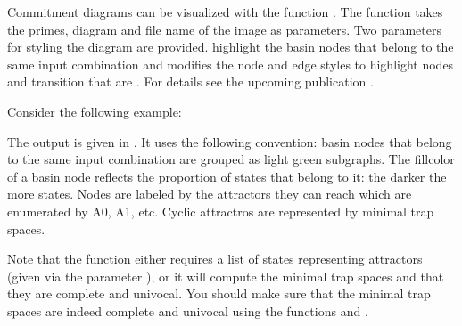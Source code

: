 \documentclass[letterpaper,10pt,english]{sphinxmanual}
\begin{document}
Commitment diagrams can be visualized with the function .
The function takes the primes, diagram and file name of the image as parameters.
Two parameters for styling the diagram are provided.
 highlight the basin nodes that belong to the same input combination and  modifies the node and edge styles to
highlight nodes and transition that are . For details see the upcoming publication {\hyperref[\detokenize{Bibliography:klarner2016basins}]{}}.

Consider the following example:

\begin{sphinxVerbatim}[commandchars=\\\{\}]
  
    
\end{sphinxVerbatim}

The output is given in {\hyperref[\detokenize{Manual:figure26}]{}}.
It uses the following convention: basin nodes that belong to the same input combination are grouped as light green subgraphs.
The fillcolor of a basin node reflects the proportion of states that belong to it: the darker the more states.
Nodes are labeled by the attractors they can reach which are enumerated by A0, A1, etc.
Cyclic attractros are represented by minimal trap spaces.

Note that the function {\hyperref[\detokenize{Basins:commitment-diagram}]{}} either requires a list of states representing attractors (given via the parameter ),
or it will compute the minimal trap spaces and  that they are complete and univocal.
You should make sure that the minimal trap spaces are indeed complete and univocal using the functions {\hyperref[\detokenize{AttractorDetection:completeness}]{}} and {\hyperref[\detokenize{AttractorDetection:univocality}]{}}.
\end{document}
